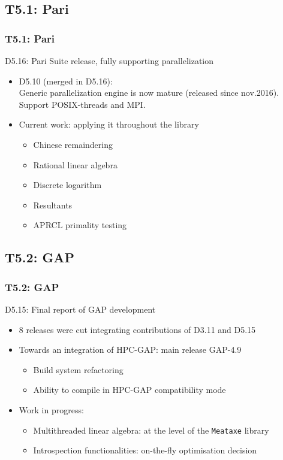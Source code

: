 \documentclass{beamer}
\begin{document}
\subsection{T5.1: Pari}
\begin{frame}
  \frametitle{T5.1: Pari}
  \begin{block} {D5.16: Pari Suite release, fully supporting parallelization}
    \begin{itemize}
    \item D5.10 (merged in D5.16):\\ Generic parallelization engine is now mature
      (released since nov.2016). Support POSIX-threads and MPI.
    \item Current work: applying it throughout the library
      \begin{itemize}
      \item Chinese remaindering
      \item Rational linear algebra
      \item Discrete logarithm
      \item Resultants
      \item APRCL primality testing
      \end{itemize}
      
    \end{itemize}
  \end{block}
\end{frame}

\subsection{T5.2: GAP}
\begin{frame}
  \frametitle{T5.2: GAP}
  \begin{block} {D5.15: Final report of GAP development}
    \begin{itemize}
    \item 8 releases were cut integrating contributions of D3.11 and D5.15
    \item Towards an integration of HPC-GAP: main release GAP-4.9
      \begin{itemize}
      \item Build system refactoring
      \item Ability to compile in HPC-GAP compatibility mode
      \end{itemize}
    \item Work in progress:
      \begin{itemize}
      \item  Multithreaded linear algebra: at the level of the \texttt{Meataxe} library
      \item Introspection functionalities: on-the-fly optimisation decision
      \end{itemize}
    \end{itemize}
  \end{block}
\end{frame}
\end{document}
